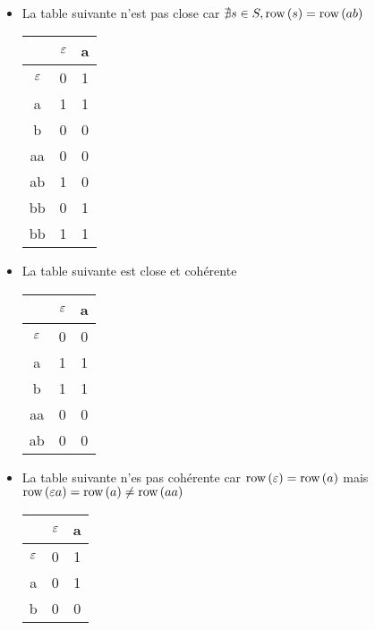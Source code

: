 \begin{exemple} \label{ex:tables}
	\ \newline
	\begin{itemize}
		\item La table suivante n'est pas close car $\nexists s \in S, \text{row}\left(s\right) = \text{row}\left(ab\right)$
		      \begin{center}
			      \begin{tabular}{c|c|c}
				                 & $\varepsilon$ & a \\ \hline
				      $\varepsilon$ & 0          & 1 \\
				      a          & 1          & 1 \\
				      b          & 0          & 0 \\ \hline

				      aa         & 0          & 0 \\
				      ab         & 1          & 0 \\
				      bb         & 0          & 1 \\
				      bb         & 1          & 1 \\
			      \end{tabular}
		      \end{center}

		\item La table suivante est close et cohérente
		      \begin{center}
			      \begin{tabular}{c|c|c}
				                 & $\varepsilon$ & a \\ \hline
				      $\varepsilon$ & 0          & 0 \\
				      a          & 1          & 1 \\ \hline

				      b          & 1          & 1 \\
				      aa         & 0          & 0 \\
				      ab         & 0          & 0 \\
			      \end{tabular}
		      \end{center}
		\item La table suivante n'es pas cohérente car $\text{row}\left(\varepsilon\right) = \text{row}\left(a\right)$ mais
		      $\text{row}\left(\varepsilon a\right) = \text{row}\left(a\right) \neq \text{row}\left(aa\right)$

		      \begin{center}
			      \begin{tabular}{c|c|c}
				                 & $\varepsilon$ & a \\ \hline
				      $\varepsilon$ & 0          & 1 \\
				      a          & 0          & 1 \\
				      b          & 0          & 0 \\ \hline


\end{tabular}
\end{center}
\end{itemize}
\end{exemple}

